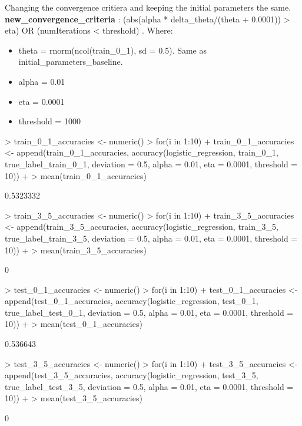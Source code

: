 \documentclass[a4paper]{article}
\begin{document}
Changing the convergence critiera and keeping the initial parameters the same.
\textbf{new_convergence_criteria} : (abs(alpha * delta_theta/(theta + 0.0001)) > eta) OR (numIterations < threshold) . Where: \\
\begin{itemize}
  \item theta = rnorm(ncol(train_0_1), sd = 0.5). Same as initial_parameters_baseline.
  \item alpha = 0.01
  \item eta = 0.0001
  \item threshold = 1000
\end{itemize}

\begin{Schunk}
\begin{Sinput}
> train_0_1_accuracies <- numeric()
> for(i in 1:10){ 
+   train_0_1_accuracies <- append(train_0_1_accuracies, accuracy(logistic_regression, train_0_1, true_label_train_0_1, deviation = 0.5, alpha = 0.01, eta = 0.0001, threshold = 10))
+ }
> mean(train_0_1_accuracies)
\end{Sinput}
\begin{Soutput}
[1] 0.5323332
\end{Soutput}
\begin{Sinput}
> train_3_5_accuracies <- numeric()
> for(i in 1:10){ 
+   train_3_5_accuracies <- append(train_3_5_accuracies, accuracy(logistic_regression, train_3_5, true_label_train_3_5, deviation = 0.5, alpha = 0.01, eta = 0.0001, threshold = 10))
+ }
> mean(train_3_5_accuracies)
\end{Sinput}
\begin{Soutput}
[1] 0
\end{Soutput}
\begin{Sinput}
> test_0_1_accuracies <- numeric()
> for(i in 1:10){
+  test_0_1_accuracies <- append(test_0_1_accuracies, accuracy(logistic_regression, test_0_1, true_label_test_0_1, deviation = 0.5, alpha = 0.01, eta = 0.0001, threshold = 10)) 
+ }
> mean(test_0_1_accuracies)
\end{Sinput}
\begin{Soutput}
[1] 0.536643
\end{Soutput}
\begin{Sinput}
> test_3_5_accuracies <- numeric()
> for(i in 1:10){
+   test_3_5_accuracies <- append(test_3_5_accuracies, accuracy(logistic_regression, test_3_5, true_label_test_3_5, deviation = 0.5, alpha = 0.01, eta = 0.0001, threshold = 10))
+ }
> mean(test_3_5_accuracies)
\end{Sinput}
\begin{Soutput}
[1] 0
\end{Soutput}
\end{Schunk}
\end{document}
